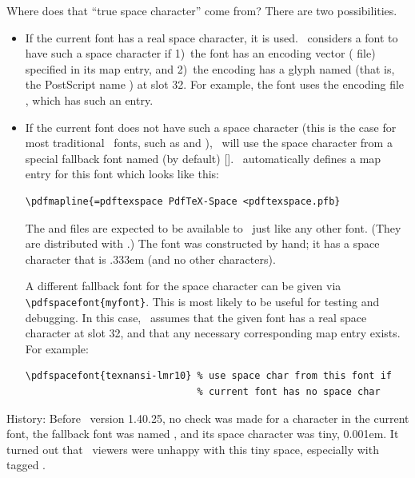 \documentclass{pdftexmanual}
\begin{document}
Where does that ``true space character'' come from?
There are two possibilities.

\begin{itemize}
\item If the current font has a real space character, it is used. 
\PDFTEX\ considers a font to have such a space character if 1)~the font
has an encoding vector ( file) specified in its map entry,
and 2)~the encoding has a glyph named  (that is, the
PostScript name ) at slot 32. For example, the font
 uses the encoding file ,
which has such an entry.

\item
If the current font does not have such a space character (this is the
case for most traditional \TEX\ fonts, such as  and
), \PDFTEX\ will use the space character from a special
fallback font named (by default) [].
\PDFTEX\ automatically defines a map entry for this font which looks
like this:

\begin{verbatim}
\pdfmapline{=pdftexspace PdfTeX-Space <pdftexspace.pfb}
\end{verbatim}

The  and  files are expected
to be available to \PDFTEX\ just like any other font. (They are
distributed with \PDFTEX.) The  font was constructed
by hand; it has a space character that is .333em (and no other
characters).

A different fallback font for the space character can be given via
\verb|\pdfspacefont{myfont}|. This is most likely to be useful for
testing and debugging. In this case, \PDFTEX\ assumes that the given font
has a real space character at slot 32, and that any necessary
corresponding map entry exists. For example:

\begin{verbatim}
\pdfspacefont{texnansi-lmr10} % use space char from this font if
                              % current font has no space char
\end{verbatim}
\end{itemize}

History: Before \PDFTEX\ version 1.40.25, no check was made for a
 character in the current font, the fallback font was named
, and its space character was tiny, 0.001em. It turned
out that \PDF\ viewers were unhappy with this tiny space, especially
with tagged \PDF.
\end{document}
